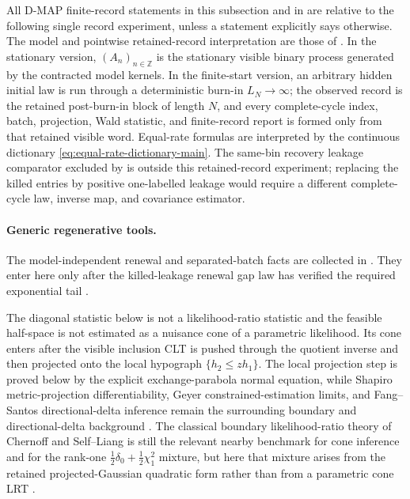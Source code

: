 \begin{assumption}\label{ass:fixed-sampled-boundary-record-main}
All D-MAP finite-record statements in this subsection and in
 are relative to the following single
record experiment, unless a statement explicitly says otherwise.  The model
and pointwise retained-record interpretation are those of
.  In the stationary version,
\((A_n)_{n\in\mathbb Z}\) is the stationary visible binary process generated by
the contracted model kernels.  In the finite-start version, an arbitrary hidden
initial law is run through a deterministic burn-in \(L_N\to\infty\); the
observed record is the retained post-burn-in block of length \(N\), and every
complete-cycle index, batch, projection, Wald statistic, and finite-record report is
formed only from that retained visible word.  Equal-rate formulas are
interpreted by the continuous dictionary
\eqref{eq:equal-rate-dictionary-main}.  The same-bin recovery leakage
comparator excluded by
 is outside this retained-record
experiment; replacing the killed entries by positive one-labelled leakage would
require a different complete-cycle law, inverse map, and covariance estimator.
\end{assumption}

\paragraph{Generic regenerative tools.}
The model-independent renewal and separated-batch facts are collected in
.  They enter here only after
the killed-leakage renewal gap law has verified the required exponential tail
\cite{GlynnIglehart1990STS,AsmussenGlynn2007,
VatsFlegalJones2019Multivariate}.

The diagonal statistic below is not a likelihood-ratio statistic and the
feasible half-space is not estimated as a nuisance cone of a parametric
likelihood.  Its cone enters after the visible inclusion CLT is pushed through
the quotient inverse and then projected onto the local hypograph
\(\{h_2\le zh_1\}\).  The local projection step is proved below by the
explicit exchange-parabola normal equation, while Shapiro
metric-projection differentiability, Geyer constrained-estimation limits, and
Fang--Santos directional-delta inference remain the surrounding boundary and
directional-delta background
\cite{Shapiro1987MetricProjection,Geyer1994ConstrainedM,
FangSantos2019DirectionalDifferentiability}.  The classical boundary
likelihood-ratio theory of Chernoff and Self--Liang is still the relevant
nearby benchmark for cone inference and for the rank-one
\(\tfrac12\delta_0+\tfrac12\chi^2_1\) mixture, but here that mixture arises
from the retained projected-Gaussian quadratic form rather than from a
parametric cone LRT
\cite{Chernoff1954LikelihoodRatio,SelfLiang1987NonstandardLRT}.

